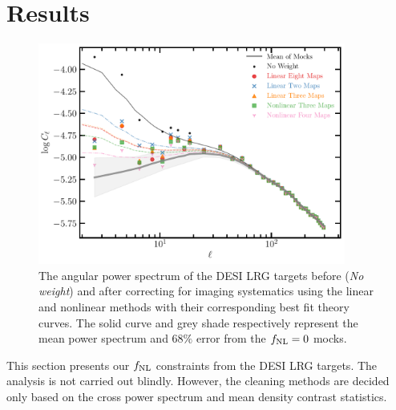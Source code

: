 \section{Results}\label{sec:results}

\begin{figure}
    \centering
    \includegraphics[width=0.9\textwidth]{figures/model_dr9.pdf} 
    \caption{The angular power spectrum of the DESI LRG targets before (\textit{No weight}) and after correcting for imaging systematics using the linear and nonlinear methods with their corresponding best fit theory curves. The solid curve and grey shade respectively represent the mean power spectrum and $68\%$ error from the $f_{\rm NL}=0$ mocks.}
    \label{fig:cl_dr9}
\end{figure}

This section presents our $f_{\rm NL}$ constraints from the DESI LRG targets. The analysis is not carried out blindly. However, the cleaning methods are decided only based on the cross power spectrum and mean density contrast statistics.   


